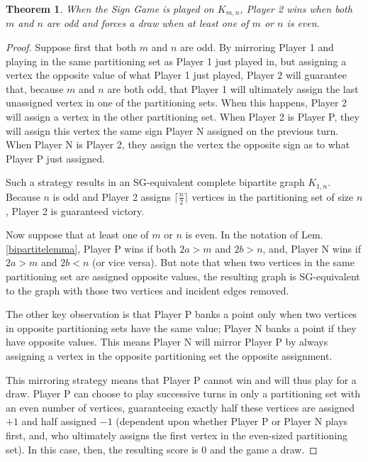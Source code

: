 \documentclass[amsart,11pt]{article}
\theoremstyle{dotless}
\theoremstyle{dotless}
\newtheorem{thm}{Theorem}[section]
\begin{document}
\begin{thm} \label{bipartitetheorem}
When the Sign Game is played on $K_{m,n}$, Player 2 wins when both $m$ and $n$ are odd and forces a draw when at least one of $m$ or $n$ is even.
\end{thm}
\begin{proof}
Suppose first that both $m$ and $n$ are odd. By mirroring Player 1 and playing in the same partitioning set as Player 1 just played in, but assigning a vertex the opposite value of what Player 1 just played, Player 2 will guarantee that, because $m$ and $n$ are both odd, that Player 1 will ultimately assign the last unassigned vertex in one of the partitioning sets. When this happens, Player 2 will assign a vertex in the other partitioning set. When Player 2 is Player P, they will assign this vertex the same sign Player N assigned on the previous turn. When Player N is Player 2, they assign the vertex the opposite sign as to what Player P just assigned.

Such a strategy results in an SG-equivalent complete bipartite graph $K_{1,n}$. Because $n$ is odd and Player 2 assigns $\lceil \frac{n}{2} \rceil$ vertices in the partitioning set of size $n$, Player 2 is guaranteed victory.

Now suppose that at least one of $m$ or $n$ is even. In the notation of Lem. \ref{bipartitelemma}, Player P wins if both $2a > m$ and $2b > n$, and, Player N wins if $2a > m$ and $2b < n$ (or vice versa). But note that when two vertices in the same partitioning set are assigned opposite values, the resulting graph is SG-equivalent to the graph with those two vertices and incident edges removed.

The other key observation is that Player P banks a point only when two vertices in opposite partitioning sets have the same value; Player N banks a point if they have opposite values. This means Player N will mirror Player P by always assigning a vertex in the opposite partitioning set the opposite assignment. 

This mirroring strategy means that Player P cannot win and will thus play for a draw. Player P can choose to play successive turns in only a partitioning set with an even number of vertices, guaranteeing exactly half these vertices are assigned $+1$ and half assigned $-1$ (dependent upon whether Player P or Player N plays first, and, who ultimately assigns the first vertex in the even-sized partitioning set). In this case, then, the resulting score is $0$ and the game a draw.


\end{proof}
\end{document}

